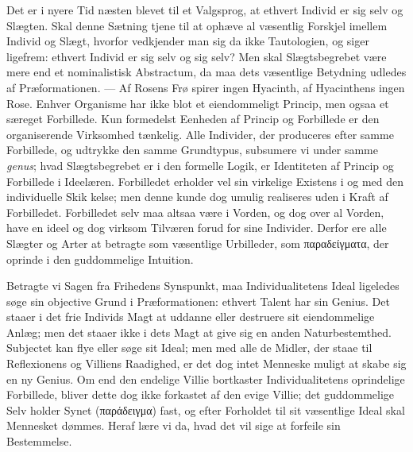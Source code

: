 \documentclass[12pt]{book}
\newcommand{\opage}[1]{\marginnote{\footnotesize\textit{[#1]}}}
\begin{document}
Det er i nyere Tid næsten blevet til et Valgsprog, at ethvert Individ er sig selv og
Slægten. Skal denne Sætning tjene til at ophæve al væsentlig Forskjel imellem Individ og
Slægt, hvorfor vedkjender man sig da ikke Tautologien, og siger ligefrem: ethvert Individ
er sig selv og sig selv? Men skal Slægtsbegrebet være mere end et nominalistisk
Abstractum, da maa dets væsentlige Betydning udledes af Præformationen. --- Af Rosens Frø
spirer ingen Hyacinth, af Hyacinthens ingen Rose. Enhver Organisme har ikke blot et
eiendommeligt Princip, men ogsaa et særeget Forbillede. Kun formedelst Eenheden af
Princip og Forbillede er den organiserende Virksomhed tænkelig. Alle Individer, der
produceres efter samme Forbillede, og udtrykke den samme Grundtypus, subsumere vi under
samme \textit{genus}; hvad Slægtsbegrebet er i den formelle Logik, er Identiteten af
Princip og Forbillede i Ideelæren. Forbilledet erholder vel sin virkelige Existens i og
med den individuelle Skik%
\opage{257}%
kelse; men denne kunde dog umulig realiseres uden i Kraft af Forbilledet. Forbilledet
selv maa altsaa være i Vorden, og dog over al Vorden, have en ideel og dog virksom
Tilværen forud for sine Individer. Derfor ere alle Slægter og Arter at betragte som
væsentlige Urbilleder, som παραδείγματα, der oprinde i den guddommelige Intuition.

Betragte vi Sagen fra Frihedens Synspunkt, maa Individualitetens Ideal ligeledes søge sin
objective Grund i Præformationen: ethvert Talent har sin Genius. Det staaer i det frie
Individs Magt at uddanne eller destruere sit eiendommelige Anlæg; men det staaer ikke i
dets Magt at give sig en anden Naturbestemthed. Subjectet kan flye eller søge sit Ideal;
men med alle de Midler, der staae til Reflexionens og Villiens Raadighed, er det dog
intet Menneske muligt at skabe sig en ny Genius. Om end den endelige Villie bortkaster
Individualitetens oprindelige Forbillede, bliver dette dog ikke forkastet af den evige
Villie; det guddommelige Selv holder Synet (παράδειγμα) fast, og efter Forholdet til sit
væsentlige Ideal skal Mennesket dømmes. Heraf lære vi da, hvad det vil sige at forfeile
sin Bestemmelse.
\end{document}
